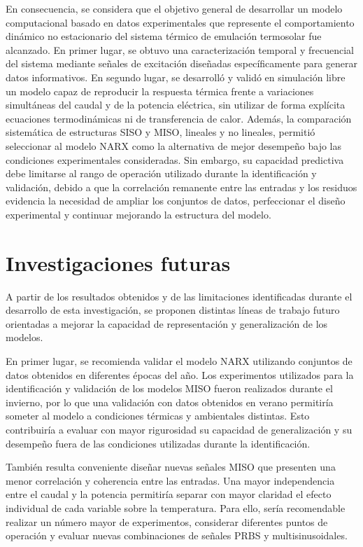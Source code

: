 \documentclass[11pt]{report}
\begin{document}
En consecuencia, se considera que el objetivo general de desarrollar un modelo computacional basado en datos experimentales que represente el comportamiento dinámico no estacionario del sistema térmico de emulación termosolar fue alcanzado. En primer lugar, se obtuvo una caracterización temporal y frecuencial del sistema mediante señales de excitación diseñadas específicamente para generar datos informativos. En segundo lugar, se desarrolló y validó en simulación libre un modelo capaz de reproducir la respuesta térmica frente a variaciones simultáneas del caudal y de la potencia eléctrica, sin utilizar de forma explícita ecuaciones termodinámicas ni de transferencia de calor. Además, la comparación sistemática de estructuras SISO y MISO, lineales y no lineales, permitió seleccionar al modelo NARX como la alternativa de mejor desempeño bajo las condiciones experimentales consideradas. Sin embargo, su capacidad predictiva debe limitarse al rango de operación utilizado durante la identificación y validación, debido a que la correlación remanente entre las entradas y los residuos evidencia la necesidad de ampliar los conjuntos de datos, perfeccionar el diseño experimental y continuar mejorando la estructura del modelo.


\section{Investigaciones futuras}


A partir de los resultados obtenidos y de las limitaciones identificadas durante el desarrollo de esta investigación, se proponen distintas líneas de trabajo futuro orientadas a mejorar la capacidad de representación y generalización de los modelos.

En primer lugar, se recomienda validar el modelo NARX utilizando conjuntos de datos obtenidos en diferentes épocas del año. Los experimentos utilizados para la identificación y validación de los modelos MISO fueron realizados durante el invierno, por lo que una validación con datos obtenidos en verano permitiría someter al modelo a condiciones térmicas y ambientales distintas. Esto contribuiría a evaluar con mayor rigurosidad su capacidad de generalización y su desempeño fuera de las condiciones utilizadas durante la identificación.

También resulta conveniente diseñar nuevas señales MISO que presenten una menor correlación y coherencia entre las entradas. Una mayor independencia entre el caudal y la potencia permitiría separar con mayor claridad el efecto individual de cada variable sobre la temperatura. Para ello, sería recomendable realizar un número mayor de experimentos, considerar diferentes puntos de operación y evaluar nuevas combinaciones de señales PRBS y multisinusoidales.
\end{document}
